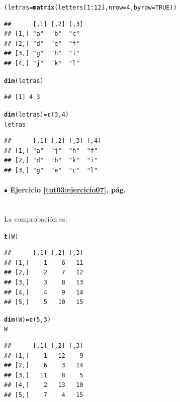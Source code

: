 \documentclass[10pt,a4paper]{article}\usepackage[]{graphicx}\usepackage[]{color}
\makeatletter
\newcommand{\hlnum}[1]{\textcolor[rgb]{0.686,0.059,0.569}{#1}}%
\newcommand{\hlopt}[1]{\textcolor[rgb]{0,0,0}{#1}}%
\newcommand{\hlstd}[1]{\textcolor[rgb]{0.345,0.345,0.345}{#1}}%
\newcommand{\hlkwb}[1]{\textcolor[rgb]{0.69,0.353,0.396}{#1}}%
\newcommand{\hlkwc}[1]{\textcolor[rgb]{0.333,0.667,0.333}{#1}}%
\newcommand{\hlkwd}[1]{\textcolor[rgb]{0.737,0.353,0.396}{\textbf{#1}}}%
\newenvironment{kframe}{%
 \def\at@end@of@kframe{}%
 \ifinner\ifhmode%
  \def\at@end@of@kframe{\end{minipage}}%
  \begin{minipage}{\columnwidth}%
 \fi\fi%
 \def\FrameCommand##1{\hskip\@totalleftmargin \hskip-\fboxsep
 \colorbox{shadecolor}{##1}\hskip-\fboxsep
     \hskip-\linewidth \hskip-\@totalleftmargin \hskip\columnwidth}%
 \MakeFramed {\advance\hsize-\width
   \@totalleftmargin\z@ \linewidth\hsize
   \@setminipage}}%
 {\par\unskip\endMakeFramed%
 \at@end@of@kframe}
\newenvironment{knitrout}{}{} %
\makeatother
\begin{document}
\begin{knitrout}
\color{fgcolor}\begin{kframe}
\begin{alltt}
\hlstd{(letras} \hlkwb{=} \hlkwd{matrix}\hlstd{(letters[}\hlnum{1}\hlopt{:}\hlnum{12}\hlstd{],} \hlkwc{nrow}\hlstd{=}\hlnum{4}\hlstd{,} \hlkwc{byrow}\hlstd{=}\hlnum{TRUE}\hlstd{))}
\end{alltt}
\begin{verbatim}
##      [,1] [,2] [,3]
## [1,] "a"  "b"  "c" 
## [2,] "d"  "e"  "f" 
## [3,] "g"  "h"  "i" 
## [4,] "j"  "k"  "l"
\end{verbatim}
\begin{alltt}
\hlkwd{dim}\hlstd{(letras)}
\end{alltt}
\begin{verbatim}
## [1] 4 3
\end{verbatim}
\begin{alltt}
\hlkwd{dim}\hlstd{(letras)}\hlkwb{=}\hlkwd{c}\hlstd{(}\hlnum{3}\hlstd{,}\hlnum{4}\hlstd{)}
\hlstd{letras}
\end{alltt}
\begin{verbatim}
##      [,1] [,2] [,3] [,4]
## [1,] "a"  "j"  "h"  "f" 
## [2,] "d"  "b"  "k"  "i" 
## [3,] "g"  "e"  "c"  "l"
\end{verbatim}
\end{kframe}
\end{knitrout}

\paragraph{\bf $\bullet$ Ejercicio \ref{tut03:ejercicio07}, pág. \pageref{tut03:ejercicio07}}
\label{tut03:ejercicio07:sol}\quad\\


La comprobación es:
\begin{knitrout}
\color{fgcolor}\begin{kframe}
\begin{alltt}
\hlkwd{t}\hlstd{(W)}
\end{alltt}
\begin{verbatim}
##      [,1] [,2] [,3]
## [1,]    1    6   11
## [2,]    2    7   12
## [3,]    3    8   13
## [4,]    4    9   14
## [5,]    5   10   15
\end{verbatim}
\begin{alltt}
\hlkwd{dim}\hlstd{(W)} \hlkwb{=} \hlkwd{c}\hlstd{(}\hlnum{5}\hlstd{,}\hlnum{3}\hlstd{)}
\hlstd{W}
\end{alltt}
\begin{verbatim}
##      [,1] [,2] [,3]
## [1,]    1   12    9
## [2,]    6    3   14
## [3,]   11    8    5
## [4,]    2   13   10
## [5,]    7    4   15
\end{verbatim}
\end{kframe}
\end{knitrout}
\end{document}
